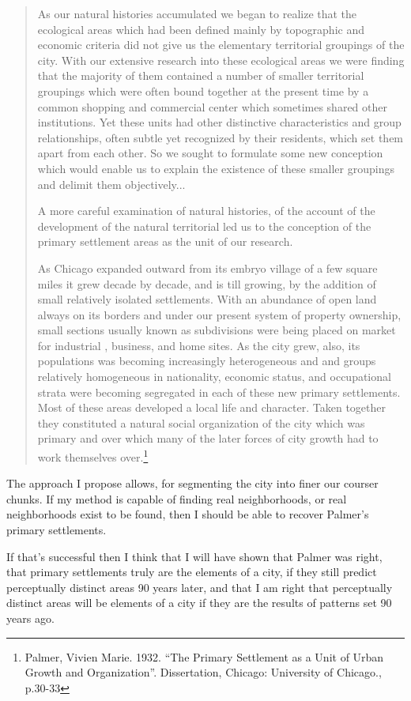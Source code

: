 \documentclass{article}
\begin{document}
\begin{quote}
As our natural histories accumulated we began to realize that the
ecological areas which had been defined mainly by topographic and
economic criteria did not give us the elementary territorial
groupings of the city. With our extensive research into these
ecological areas we were finding that the majority of them contained a
number of smaller territorial groupings which were often bound
together at the present time by a common shopping and commercial
center which sometimes shared other institutions. Yet these units had
other distinctive characteristics and group relationships, often
subtle yet recognized by their residents, which set them apart
from each other. So we sought to formulate some new conception which
would enable us to explain the existence of these smaller groupings
and delimit them objectively... 

A more careful examination of natural histories, of the account of the
development of the natural territorial led us to the conception of the
primary settlement areas as the unit of our research. 

As Chicago expanded outward from its embryo village of a few square
miles it grew decade by decade, and is till growing, by the addition
of small relatively isolated settlements. With an abundance of open
land always on its borders and under our present system of property
ownership, small sections usually known as subdivisions were being
placed on market for industrial , business, and home sites. As the
city grew, also, its populations was becoming increasingly
heterogeneous and and groups relatively homogeneous in nationality,
economic status, and occupational strata were becoming segregated in
each of these new primary settlements. Most of these areas developed a
local life and character. Taken together they constituted a natural
social organization of the  city which was primary and over which
many of the later forces of city growth had to work themselves over.\footnote{Palmer, Vivien Marie. 1932. ``The Primary Settlement as a
Unit of Urban Growth and Organization''. Dissertation, Chicago:
University of Chicago., p.30-33}
\end{quote}

The approach I propose allows, for segmenting the city into finer our
courser chunks. If my method is capable of finding real neighborhoods,
or real neighborhoods exist to be found, then I should be able to
recover Palmer's primary settlements.

If that's successful then I think that I will have shown that Palmer
was right, that primary settlements truly are the elements of a city,
if they still predict perceptually distinct areas 90 years later, and
that I am right that perceptually distinct areas will be elements of a
city if they are the results of patterns set 90 years ago.
\end{document}
